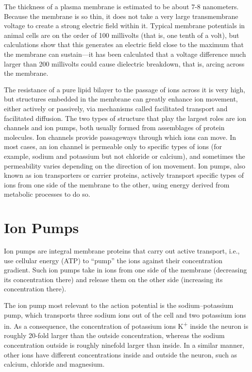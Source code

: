 The thickness of a plasma membrane is estimated to be about 7-8 nanometers. Because the membrane is so thin, it does not take a very large transmembrane voltage to create a strong electric field within it. Typical membrane potentials in animal cells are on the order of 100 millivolts (that is, one tenth of a volt), but calculations show that this generates an electric field close to the maximum that the membrane can sustain---it has been calculated that a voltage difference much larger than 200 millivolts could cause dielectric breakdown, that is, arcing across the membrane.

The resistance of a pure lipid bilayer to the passage of ions across it is very high, but structures embedded in the membrane can greatly enhance ion movement, either actively or passively, via mechanisms called facilitated transport and facilitated diffusion. The two types of structure that play the largest roles are ion channels and ion pumps, both usually formed from assemblages of protein molecules. Ion channels provide passageways through which ions can move. In most cases, an ion channel is permeable only to specific types of ions (for example, sodium and potassium but not chloride or calcium), and sometimes the permeability varies depending on the direction of ion movement. Ion pumps, also known as ion transporters or carrier proteins, actively transport specific types of ions from one side of the membrane to the other, using energy derived from metabolic processes to do so.

\hypertarget{ion-pumps}{%
\section{Ion Pumps}\label{ion-pumps}}

Ion pumps are integral membrane proteins that carry out active transport, i.e., use cellular energy (ATP) to ``pump'' the ions against their concentration gradient. Such ion pumps take in ions from one side of the membrane (decreasing its concentration there) and release them on the other side (increasing its concentration there).

The ion pump most relevant to the action potential is the sodium--potassium pump, which transports three sodium ions out of the cell and two potassium ions in. As a consequence, the concentration of potassium ions K\textsuperscript{+} inside the neuron is roughly 20-fold larger than the outside concentration, whereas the sodium concentration outside is roughly ninefold larger than inside. In a similar manner, other ions have different concentrations inside and outside the neuron, such as calcium, chloride and magnesium.



